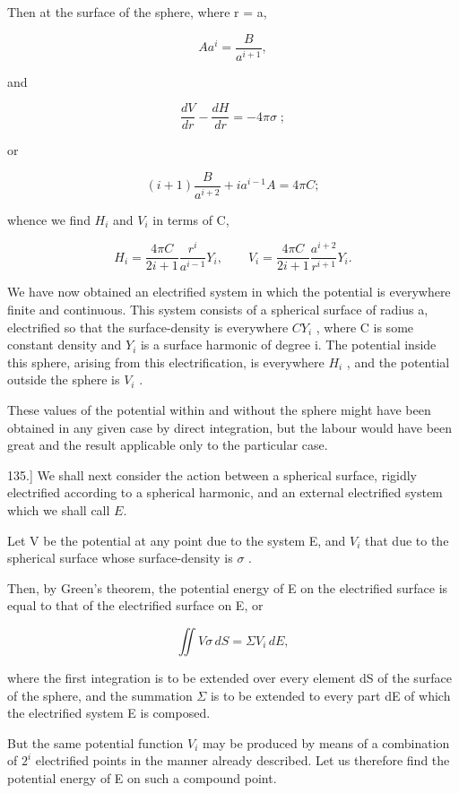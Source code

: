 \documentclass[11pt,a4paper]{article}
\begin{document}
Then at the surface of the sphere, where r = a,

\[
Aa^i = \frac{B}{a^{i+1}},
\]

and

\[
\frac{dV}{dr} - \frac{dH}{dr} = -4\pi\sigma \; ;
\]

or

\[
(i+1)\frac{B}{a^{i+2}} + ia^{i-1}A = 4\pi C;
\]

whence we find  $H_i$  and  $V_i$  in terms of C,

\begin{equation}\tag{49}
H_{i} = \frac{4\pi C}{2i+1} \frac{r^{i}}{a^{i-1}} Y_{i}, \qquad V_{i} = \frac{4\pi C}{2i+1} \frac{a^{i+2}}{r^{i+1}} Y_{i}.
\end{equation}

We have now obtained an electrified system in which the potential is everywhere finite and continuous. This system consists of a spherical surface of radius a, electrified so that the surface-density is everywhere  $CY_i$ , where C is some constant density and  $Y_i$  is a surface harmonic of degree i. The potential inside this sphere, arising from this electrification, is everywhere  $H_i$ , and the potential outside the sphere is  $V_i$ .

These values of the potential within and without the sphere might have been obtained in any given case by direct integration, but the labour would have been great and the result applicable only to the particular case.

135.] We shall next consider the action between a spherical surface, rigidly electrified according to a spherical harmonic, and an external electrified system which we shall call $E$.

Let V be the potential at any point due to the system E, and  $V_i$  that due to the spherical surface whose surface-density is  $\sigma$ .

Then, by Green's theorem, the potential energy of E on the electrified surface is equal to that of the electrified surface on E, or

\begin{equation}\tag{50}
\iint V\sigma \, dS = \Sigma V_i \, dE,
\end{equation}

where the first integration is to be extended over every element dS of the surface of the sphere, and the summation  $\Sigma$  is to be extended to every part dE of which the electrified system E is composed.

But the same potential function  $V_i$  may be produced by means of a combination of  $2^i$  electrified points in the manner already described. Let us therefore find the potential energy of E on such a compound point.
\end{document}
